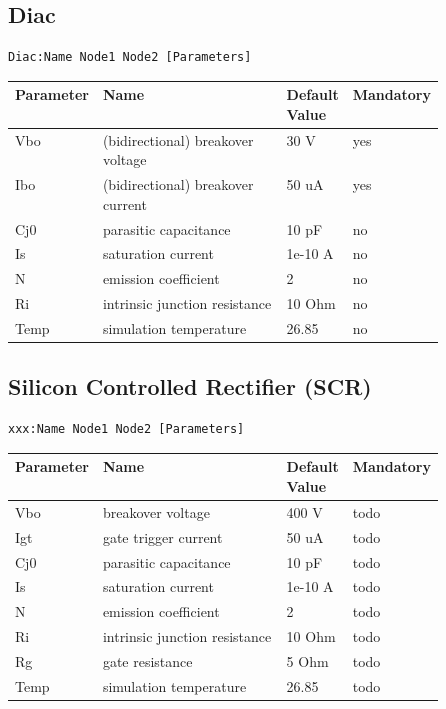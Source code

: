 \subsection{Diac}

\begin{verbatim}
Diac:Name Node1 Node2 [Parameters]
\end{verbatim}


\begin{tabular}{|l|p{0.5\linewidth}|l|l|}
\hline
Parameter & Name & Default Value & Mandatory \\
\hline
Vbo & (bidirectional) breakover voltage & 30 V & yes \\
Ibo & (bidirectional) breakover current & 50 uA & yes \\
Cj0 & parasitic capacitance & 10 pF & no \\
Is & saturation current & 1e-10 A & no \\
N & emission coefficient & 2 & no \\
Ri & intrinsic junction resistance & 10 Ohm & no \\
Temp & simulation temperature & 26.85 & no \\
\hline
\end{tabular}


\subsection{Silicon Controlled Rectifier (SCR)}

\begin{verbatim}
xxx:Name Node1 Node2 [Parameters]
\end{verbatim}


\begin{tabular}{|l|p{0.5\linewidth}|l|l|}
\hline
Parameter & Name & Default Value & Mandatory \\
\hline
Vbo & breakover voltage & 400 V & todo \\
Igt & gate trigger current & 50 uA & todo \\
Cj0 & parasitic capacitance & 10 pF & todo \\
Is & saturation current & 1e-10 A & todo \\
N & emission coefficient & 2 & todo \\
Ri & intrinsic junction resistance & 10 Ohm & todo \\
Rg & gate resistance & 5 Ohm & todo \\
Temp & simulation temperature & 26.85 & todo \\
\hline
\end{tabular}


